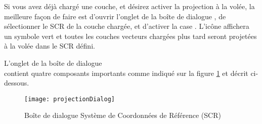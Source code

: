 Si vous avez déjà chargé une couche, et désirez activer la projection à la
volée, la meilleure façon de faire est d'ouvrir l'onglet  de la boîte de dialogue , de sélectionner le SCR de la couche chargée, et d'activer la case
. L'icône
 affichera un symbole vert et
toutes les couches vecteurs chargées plus tard seront projetées à la volée dans
le SCR défini.
 
L'onglet  de la boîte de dialogue\\
 contient quatre composants importants comme
indiqué sur la figure \ref{fig:projections} et décrit ci-dessous.

\begin{figure}[ht]
   \begin{center}
   \texttt{[image: projectionDialog]}\caption{Boîte de dialogue Système de Coordonnées de Référence (SCR) \nixcaption} \label{fig:projections}
\end{center}
\end{figure}

